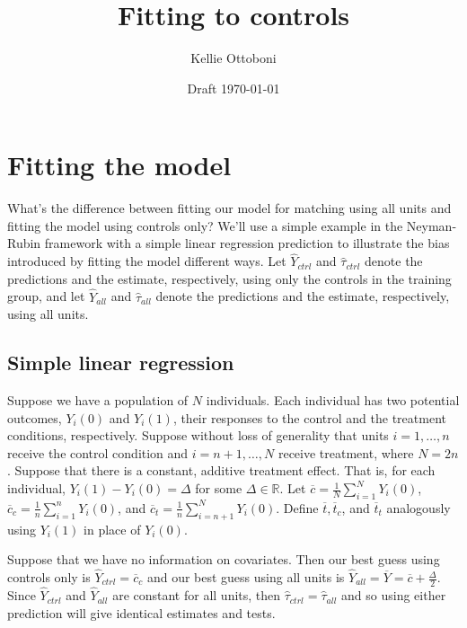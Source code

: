 \documentclass[12pt]{article}
\title{Fitting to controls}
\author{Kellie Ottoboni}
\date{Draft \today}
\newcommand{\reals}{\mathbb{R}}
\begin{document}
\maketitle

\section{Fitting the model}
What's the difference between fitting our model for matching using all units and fitting the model using controls only?  
We'll use a simple example in the Neyman-Rubin framework with a simple linear regression prediction to illustrate the bias introduced by fitting the model different ways.
Let $\hat{Y}_{ctrl}$ and $\hat{\tau}_{ctrl}$ denote the predictions and the estimate, respectively, using only the controls in the training group, and let $\hat{Y}_{all}$ and $\hat{\tau}_{all}$ denote the predictions and the estimate, respectively, using all units.

\subsection{Simple linear regression}

Suppose we have a population of $N$ individuals.  Each individual has two potential outcomes, $Y_i(0)$ and $Y_i(1)$, their responses to the control and the treatment conditions, respectively.  Suppose without loss of generality that units $i=1,\dots, n$ receive the control condition and $i = n+1,\dots, N$ receive treatment, where $N = 2n$.  Suppose that there is a constant, additive treatment effect.  That is, for each individual, $Y_i(1) - Y_i(0) = \Delta$ for some $\Delta \in \reals$.  Let $\overline{c} = \frac{1}{N}\sum_{i=1}^N Y_i(0)$, $\overline{c}_c = \frac{1}{n}\sum_{i=1}^n Y_i(0)$, and $\overline{c}_t = \frac{1}{n}\sum_{i=n+1}^N Y_i(0)$.  Define $\overline{t}, \overline{t}_c$, and $\overline{t}_t$ analogously using $Y_i(1)$ in place of $Y_i(0)$.

Suppose that we have no information on covariates.  Then our best guess using controls only is $\hat{Y}_{ctrl} = \overline{c}_c$ and our best guess using all units is $\hat{Y}_{all} = \overline{Y} = \overline{c} + \frac{\Delta}{2}$.  Since $\hat{Y}_{ctrl}$ and $\hat{Y}_{all}$ are constant for all units, then $\hat{\tau}_{ctrl} = \hat{\tau}_{all}$ and so using either prediction will give identical estimates and tests.
\end{document}
